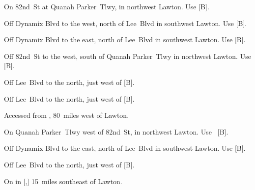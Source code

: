 
\begin{LocationList}

On 82nd~St at Quanah Parker~Tlwy, in northwest Lawton.
Use  [B].

Off Dynamix Blvd to the west, north of Lee~Blvd in southwest Lawton.
Use  [B].

Off Dynamix Blvd to the east, north of Lee~Blvd in southwest Lawton.
Use  [B].

Off 82nd~St to the west, south of Quanah Parker~Tlwy in northwest Lawton.
Use  [B].

\Location{\GarageHQ \Garage}
Off Lee~Blvd to the north, just west of  [B].

Off Lee~Blvd to the north, just west of  [B].

Accessed from , 80~miles west of Lawton.

On Quanah Parker~Tlwy west of 82nd~St, in northwest Lawton.
Use~ [B].

Off Dynamix Blvd to the east, north of Lee~Blvd in southwest Lawton.
Use  [B].

\Location{\TruckService \Service}
Off Lee~Blvd to the north, just west of  [B].

\Location{\TruckStop \Gas \Rest}
On  in [,] 15~miles southeast of Lawton.

\end{LocationList}
